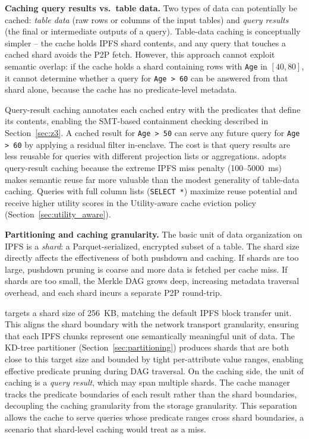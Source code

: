 \textbf{Caching query results vs.\ table data.}
Two types of data can potentially be cached: \emph{table data} (raw rows or columns of the input tables) and \emph{query results} (the final or intermediate outputs of a query). Table-data caching is conceptually simpler -- the cache holds IPFS shard contents, and any query that touches a cached shard avoids the P2P fetch. However, this approach cannot exploit semantic overlap: if the cache holds a shard containing rows with \texttt{Age} in $[40, 80]$, it cannot determine whether a query for \texttt{Age > 60} can be answered from that shard alone, because the cache has no predicate-level metadata.
 
Query-result caching annotates each cached entry with the predicates that define its contents, enabling the SMT-based containment checking described in Section~\ref{sec:z3}. A cached result for \texttt{Age > 50} can serve any future query for \texttt{Age > 60} by applying a residual filter in-enclave. The cost is that query results are less reusable for queries with different projection lists or aggregations. \ours{} adopts query-result caching because the extreme IPFS miss penalty (100--5000~ms) makes semantic reuse far more valuable than the modest generality of table-data caching. Queries with full column lists (\texttt{SELECT *}) maximize reuse potential and receive higher utility scores in the Utility-aware cache eviction policy (Section~\ref{sec:utility_aware}).
 
\textbf{Partitioning and caching granularity.}
The basic unit of data organization on IPFS is a \emph{shard}: a Parquet-serialized, encrypted subset of a table. The shard size directly affects the effectiveness of both pushdown and caching. If shards are too large, pushdown pruning is coarse and more data is fetched per cache miss. If shards are too small, the Merkle DAG grows deep, increasing metadata traversal overhead, and each shard incurs a separate P2P round-trip.
 
\ours{} targets a shard size of 256~KB, matching the default IPFS block transfer unit. This aligns the shard boundary with the network transport granularity, ensuring that each IPFS chunks represent one semantically meaningful unit of data. The KD-tree partitioner (Section~\ref{sec:partitioning}) produces shards that are both close to this target size and bounded by tight per-attribute value ranges, enabling effective predicate pruning during DAG traversal. On the caching side, the unit of caching is a \emph{query result}, which may span multiple shards. The cache manager tracks the predicate boundaries of each result rather than the shard boundaries, decoupling the caching granularity from the storage granularity. This separation allows the cache to serve queries whose predicate ranges cross shard boundaries, a scenario that shard-level caching would treat as a miss.


